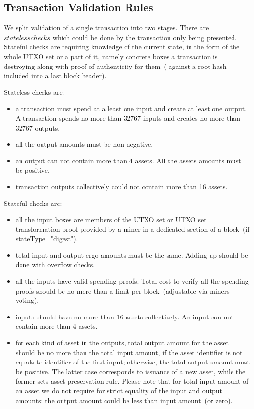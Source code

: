 \documentclass[]{article}   %
\newcommand{\authnote}[2]{\marginpar{\parbox{\marginparwidth}{\tiny %
  \textsf{#1 {\textcolor{blue}{notes: #2}}}}}%
  \textcolor{blue}{\textbf{\dag}}}
\newcommand{\authnote}[2]{
  \textsf{#1 \textcolor{blue}{: #2}}}
\newcommand{\authnote}[2]{}
\newcommand{\knote}[1]{{\authnote{\textcolor{green}{Alex notes}}{#1}}}
\begin{document}
\subsection{Transaction Validation Rules}
\label{tx-validation}

We split validation of a single transaction into two stages. There are $stateless checks$ which could be done by the
transaction only being presented. Stateful checks are requiring knowledge of the current state, in the form of the whole
UTXO set or a part of it, namely concrete boxes a transaction is destroying along with proof of authenticity for them~(
against a root hash included into a last block header).

Stateless checks are:

\begin{itemize}
    \item{} a transaction must spend at a least one input and create at least one output. A transaction spends no more
    than $32767$ inputs and creates no more than $32767$ outputs.
    \item{} all the output amounts must be non-negative.
    \item{} an output can not contain more than 4 assets. All the assets amounts must be positive.
    \item{} transaction outputs collectively could not contain more than 16 assets.
\end{itemize}

\knote{Should we allow 0-value iutputs?}

\knote{Check box and transaction sizes.}

Stateful checks are:

\begin{itemize}
    \item{} all the input boxes are members of the UTXO set or UTXO set transformation proof
     provided by a miner in a dedicated section of a block~(if stateType="digest").
    \item{} total input and output ergo amounts must be the same. Adding up should be done with overflow checks.
    \item{} all the inputs have valid spending proofs. Total cost to verify all the spending proofs should be no more
            than a limit per block~(adjustable via miners voting).
    \item{} inputs should have no more than 16 assets collectively. An input can not contain more than 4 assets.
    \item{} for each kind of asset in the outputs, total output amount for the asset should be no more than the total
            input amount, if the asset identifier is not equals to identifier of the first input; otherwise, the total
            output amount must be positive. The latter case corresponds to issuance of a new asset, while the former
            sets asset preservation rule. Please note that for total input amount of an asset we do not require for
            strict equality of the input and output amounts: the output amount could be less than input amount~(or zero).
\end{itemize}
\end{document}

